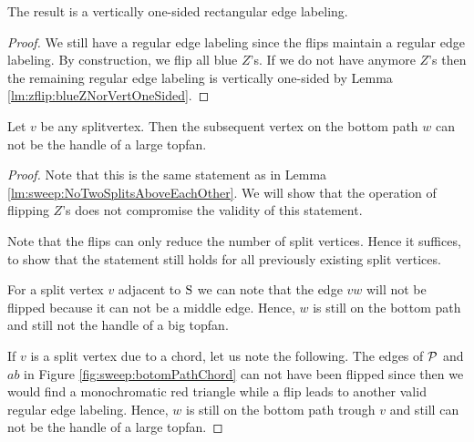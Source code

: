   \begin{lemma}
    \label{lm:sweep:vertOnsided}
    The result is a vertically one-sided rectangular edge labeling.
  \end{lemma}
  \begin{proof}
    We still have a regular edge labeling since the flips maintain a regular edge labeling.
    By construction, we flip all blue $Z$'s. If we do not have anymore $Z$'s then the remaining regular edge labeling is vertically one-sided by Lemma \ref{lm:zflip:blueZNorVertOneSided}.
  \end{proof}

  \begin{lemma}
    \label{lm:zflip:NoTwoSplitsAboveEachOtherVertOnesided}
    Let $v$ be any splitvertex. Then the subsequent vertex on the bottom path $w$ can not be the handle of a large topfan.
  \end{lemma}

  \begin{proof}
    Note that this is the same statement as in Lemma \ref{lm:sweep:NoTwoSplitsAboveEachOther}. We will show that the operation of flipping $Z$'s does not compromise the validity of this statement.

    Note that the flips can only reduce the number of split vertices.
    Hence it suffices, to show that the statement still holds for all previously existing split vertices.

    For a split vertex $v$ adjacent to $\pS$ we can note that the edge $vw$ will not be flipped because it can not be a middle edge.
    Hence, $w$ is still on the bottom path and still not the handle of a big topfan.

    If $v$ is a split vertex due to a chord, let us note the following.
    The edges of $\P$ and $ab$ in Figure \ref{fig:sweep:botomPathChord} can not have been flipped since then we would find a monochromatic red triangle while a flip leads to another valid regular edge labeling.
    Hence, $w$ is still on the bottom path trough $v$ and still can not be the handle of a large topfan.
  \end{proof}
